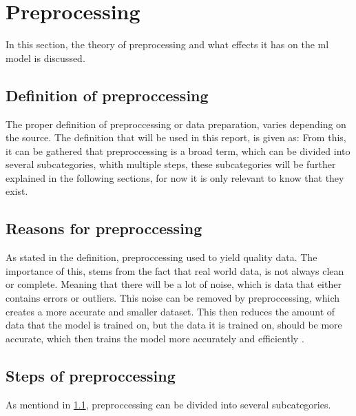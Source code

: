 \section{Preprocessing}
In this section, the theory of preprocessing and what effects it has on the \gls{ml} model is discussed. 


\subsection{Definition of preproccessing}\label{subsec:preprocessing-definition}
The proper definition of preproccessing or data preparation, varies depending on the source. The definition that will be used in this report, is given as:
From this, it can be gathered that preproccessing is a broad term, which can be divided into several subcategories, whith multiple steps, these subcategories will be further explained in the following sections, for now it is only relevant to know that they exist. 

\subsection{Reasons for preproccessing}
As stated in the definition, preproccessing used to yield quality data. The importance of this, stems from the fact that real world data, is not always clean or complete. Meaning that there will be a lot of noise, which is data that either contains errors or outliers. This noise can be removed by preproccessing, which creates a more accurate and smaller dataset. This then reduces the amount of data that the model is trained on, but the data it is trained on, should be more accurate, which then trains the model more accurately and efficiently \cite{doi:10.1080/713827180}. 

\subsection{Steps of preproccessing}
As mentiond in \ref{subsec:preprocessing-definition}, preproccessing can be divided into several subcategories. 

